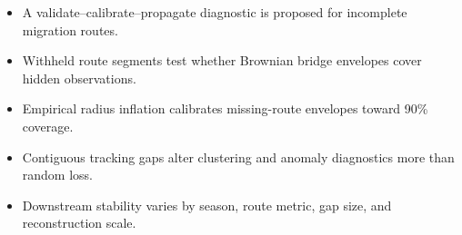 \begin{itemize}
\item A validate--calibrate--propagate diagnostic is proposed for incomplete migration routes.
\item Withheld route segments test whether Brownian bridge envelopes cover hidden observations.
\item Empirical radius inflation calibrates missing-route envelopes toward 90\% coverage.
\item Contiguous tracking gaps alter clustering and anomaly diagnostics more than random loss.
\item Downstream stability varies by season, route metric, gap size, and reconstruction scale.
\end{itemize}
